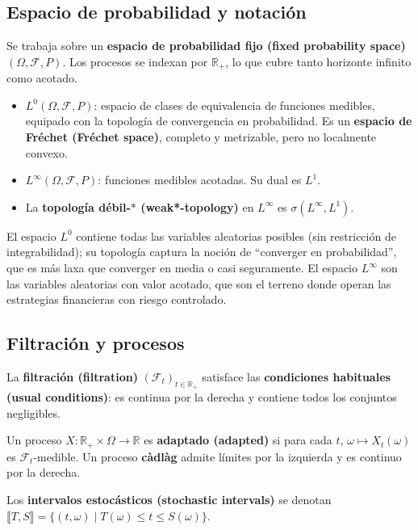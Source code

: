 \documentclass[12pt]{article}
\begin{document}
\subsection{Espacio de probabilidad y notaci\'on}

Se trabaja sobre un \textbf{espacio de probabilidad fijo (fixed probability space)} $(\Omega, \mathscr{F}, P)$. Los procesos se indexan por $\mathbb{R}_+$, lo que cubre tanto horizonte infinito como acotado.

\begin{itemize}
    \item $L^0(\Omega, \mathscr{F}, P)$: espacio de clases de equivalencia de funciones medibles, equipado con la topolog\'ia de convergencia en probabilidad. Es un \textbf{espacio de Fr\'echet (Fr\'echet space)}, completo y metrizable, pero no localmente convexo.
    \item $L^\infty(\Omega, \mathscr{F}, P)$: funciones medibles acotadas. Su dual es $L^1$.
    \item La \textbf{topolog\'ia d\'ebil-$*$ (weak*-topology)} en $L^\infty$ es $\sigma(L^\infty, L^1)$.
\end{itemize}

\begin{intuicion}
El espacio $L^0$ contiene todas las variables aleatorias posibles (sin restricci\'on de integrabilidad); su topolog\'ia captura la noci\'on de ``converger en probabilidad'', que es m\'as laxa que converger en media o casi seguramente. El espacio $L^\infty$ son las variables aleatorias con valor acotado, que son el terreno donde operan las estrategias financieras con riesgo controlado.
\end{intuicion}

\subsection{Filtraci\'on y procesos}

La \textbf{filtraci\'on (filtration)} $(\mathscr{F}_t)_{t \in \mathbb{R}_+}$ satisface las \textbf{condiciones habituales (usual conditions)}: es continua por la derecha y contiene todos los conjuntos negligibles.

Un proceso $X : \mathbb{R}_+ \times \Omega \to \mathbb{R}$ es \textbf{adaptado (adapted)} si para cada $t$, $\omega \mapsto X_t(\omega)$ es $\mathscr{F}_t$-medible. Un proceso \textbf{c\`adl\`ag} admite l\'imites por la izquierda y es continuo por la derecha.

Los \textbf{intervalos estoc\'asticos (stochastic intervals)} se denotan $\llbracket T, S \rrbracket = \{(t,\omega) \mid T(\omega) \leq t \leq S(\omega)\}$.
\end{document}
